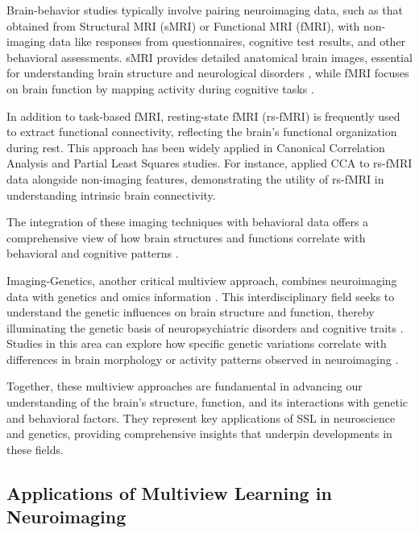 Brain-behavior studies typically involve pairing neuroimaging data, such as that obtained from Structural MRI (sMRI) or Functional MRI (fMRI), with non-imaging data like responses from questionnaires, cognitive test results, and other behavioral assessments.
sMRI provides detailed anatomical brain images, essential for understanding brain structure and neurological disorders \citep{kanai2011structural}, while fMRI focuses on brain function by mapping activity during cognitive tasks \citep{miranda2021systematic}.

In addition to task-based fMRI, resting-state fMRI (rs-fMRI) is frequently used to extract functional connectivity, reflecting the brain's functional organization during rest. This approach has been widely applied in Canonical Correlation Analysis and Partial Least Squares studies. For instance, \citet{smith2015cca} applied CCA to rs-fMRI data alongside non-imaging features, demonstrating the utility of rs-fMRI in understanding intrinsic brain connectivity.

The integration of these imaging techniques with behavioral data offers a comprehensive view of how brain structures and functions correlate with behavioral and cognitive patterns \citep{rypma2001age,genon2022linking}.

Imaging-Genetics, another critical multiview approach, combines neuroimaging data with genetics and omics information \citep{le2008sparse}.
This interdisciplinary field seeks to understand the genetic influences on brain structure and function, thereby illuminating the genetic basis of neuropsychiatric disorders and cognitive traits \citep{bogdan2017imaging}.
Studies in this area can explore how specific genetic variations correlate with differences in brain morphology or activity patterns observed in neuroimaging \citep{liu2014review}.

Together, these multiview approaches are fundamental in advancing our understanding of the brain's structure, function, and its interactions with genetic and behavioral factors.
They represent key applications of SSL in neuroscience and genetics, providing comprehensive insights that underpin developments in these fields.

\subsection{Applications of Multiview Learning in Neuroimaging}


